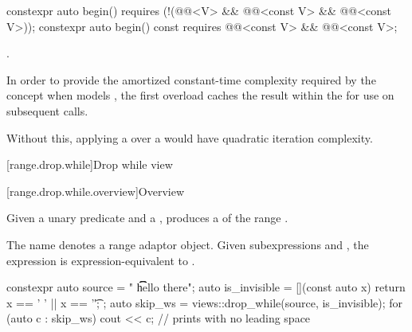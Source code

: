 %
\begin{itemdecl}
constexpr auto begin()
  requires (!(@@<V> &&
              @@<const V> && @@<const V>));
constexpr auto begin() const
  requires @@<const V> && @@<const V>;
\end{itemdecl}

\begin{itemdescr}
\pnum
\returns
{}.

\pnum
\remarks
In order to provide the amortized constant-time complexity required
by the  concept
when  models ,
the first overload caches the result within the 
for use on subsequent calls.
\begin{note}
Without this,
applying a  over a 
would have quadratic iteration complexity.
\end{note}
\end{itemdescr}

[range.drop.while]{Drop while view}

[range.drop.while.overview]{Overview}

\pnum
Given a unary predicate  and a  ,
 produces a 
of the range .

\pnum
{}%
The name 
denotes a range adaptor object.
Given subexpressions  and ,
the expression 
is expression-equivalent to .

\pnum
\begin{example}
\begin{codeblock}
constexpr auto source = "  \t   \t   \t   hello there";
auto is_invisible = [](const auto x) { return x == ' ' || x == '\t'; };
auto skip_ws = views::drop_while(source, is_invisible);
for (auto c : skip_ws) {
  cout << c;                                    // prints  with no leading space
}
\end{codeblock}
\end{example}

